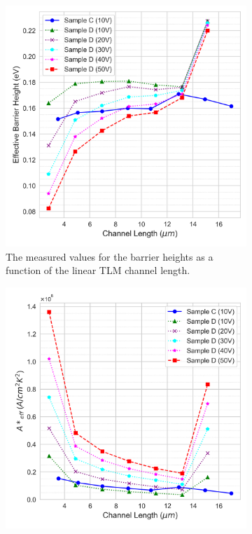 \begin{refsection}
\begin{figure}[htbp]
    \centering
    \begin{subfigure}[b]{0.49\textwidth}
        \includegraphics[width=\textwidth]{Chapter3/Figs/Raster/barrier_comparison.png}
        \caption{The measured values for the barrier heights as a function of the linear TLM channel length.}
        \label{fig:barrier}
    \end{subfigure}
    \hfill %
    \begin{subfigure}[b]{0.49\textwidth}
        \includegraphics[width=\textwidth]{Chapter3/Figs/Raster/richardson_comparison.png}

\end{subfigure}
\end{figure}
\end{refsection}
